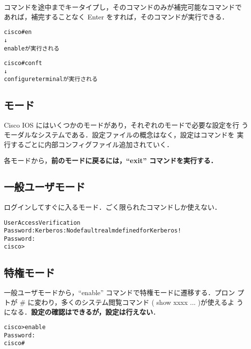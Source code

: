コマンドを途中までキータイプし，そのコマンドのみが補完可能なコマンドで
あれば，補完することなく Enter をすれば，そのコマンドが実行できる．

\begin{center}
\begin{screen}
\begin{alltt}
cisco#en
       ↓
    enableが実行される

cisco#conf t
       ↓
   configure terminal が実行される
\end{alltt}
\end{screen}
\end{center}

\subsection*{モード}

Cisco IOS にはいくつかのモードがあり，それぞれのモードで必要な設定を行
うモーダルなシステムである．設定ファイルの概念はなく，設定はコマンドを
実行するごとに内部コンフィグファイル追加されていく．

各モードから，\textbf{前のモードに戻るには，``exit'' コマンドを実行する．}

\subsection*{一般ユーザモード}

ログインしてすぐに入るモード．ごく限られたコマンドしか使えない．

\begin{center}
\begin{screen}
\begin{alltt}
User Access Verification
Password: Kerberos:     No default realm defined for Kerberos!
Password:
cisco>
\end{alltt}
\end{screen}
\end{center}

\subsection*{特権モード}

一般ユーザモードから，``enable'' コマンドで特権モードに遷移する．プロン
プトが \# に変わり，多くのシステム閲覧コマンド ( show xxxx ... )が使えるよ
うになる．\textbf{設定の確認はできるが，設定は行えない}．

\begin{center}
\begin{screen}
\begin{alltt}
cisco>enable
Password:
cisco#
\end{alltt}
\end{screen}
\end{center}

